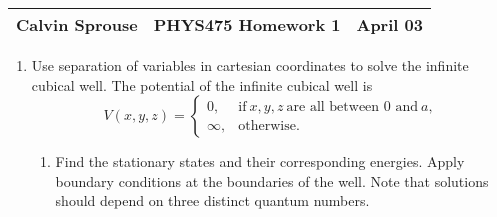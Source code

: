 \documentclass[a4paper, 12pt]{config/homework}
\begin{document}
\noindent
\begin{tabularx}{\textwidth}{>{\centering\arraybackslash}X>{\centering\arraybackslash}X>{\centering\arraybackslash}X}
Calvin Sprouse & PHYS475 Homework 1 & 2024 April 03\\
\midrule
\end{tabularx}

\begin{enumerate}
\item Use separation of variables in cartesian coordinates to solve the infinite cubical well. The potential of the infinite cubical well is
\[V(x,y,z)=\begin{cases}
0, & \text{if}\ x,y,z\ \text{are all between 0 and}\ a, \\
\infty, & \text{otherwise}.
\end{cases}\]
\begin{enumerate}[label=(\alph*.)]
\item Find the stationary states and their corresponding energies. Apply boundary conditions at the boundaries of the well. Note that solutions should depend on three distinct quantum numbers.


\end{enumerate}
\end{enumerate}
\end{document}
